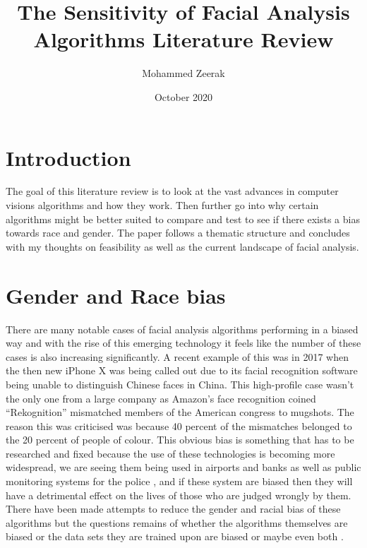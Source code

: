 \documentclass{article}
\title{The Sensitivity of Facial Analysis Algorithms
\newline\Large{Literature Review}}
\author{Mohammed Zeerak}
\date{October 2020}
\begin{document}
\maketitle

\section{Introduction}
The goal of this literature review is to look at the vast advances in computer visions algorithms and how they work. Then further go into why certain algorithms might be better suited to compare and test to see if there exists a bias towards race and gender. The paper follows a thematic structure and concludes with my thoughts on feasibility as well as the current landscape of facial analysis.

\section{Gender and Race bias}
There are many notable cases of facial analysis algorithms performing in a biased way and with the rise of this emerging technology it feels like the number of these cases is also increasing significantly. A recent example of this was in 2017 when the then new iPhone X was being called out due to its facial recognition software being unable to distinguish Chinese faces in China. This high-profile case wasn't the only one from a large company as Amazon’s face recognition coined “Rekognition” mismatched members of the American congress to mugshots. The reason this was criticised was because 40 percent of the mismatches belonged to the 20 percent of people of colour. This obvious bias is something that has to be researched and fixed because the use of these technologies is becoming more widespread, we are seeing them being used in airports and banks as well as public monitoring systems for the police \cite{Singh2020}, and if these system are biased then they will have a detrimental effect on the lives of those who are judged wrongly by them.  There have been made attempts to reduce the gender and racial bias of these algorithms but the questions remains of whether the algorithms themselves are biased or the data sets they are trained upon are biased or maybe even both \cite{Singh2020}.
\newpage
\end{document}
